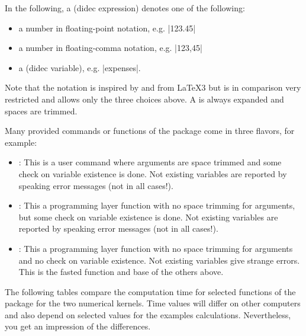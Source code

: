 \documentclass[a4paper,11pt]{ltxdoc}
\begin{document}
\medskip

In the following, a  (didec expression) denotes one of
the following:
\begin{itemize}
\item a number in floating-point notation, e.g. |123.45|
\item a number in floating-comma notation, e.g. |123,45|
\item a  (didec variable), e.g. |expenses|.
\end{itemize}
Note that the notation  is inspired by  and 
from \LaTeX3 but is in comparison very restricted and allows only the three choices above.
A  is always expanded and spaces are trimmed.

\medskip

Many provided commands or functions of the package come in three flavors, for
example:
\begin{itemize}
\item {}: This is a user command where arguments are space trimmed
  and some check on variable existence is done.
  Not existing variables are reported by speaking error messages (not in all cases!).
\item {}: This a programming layer function
  with no space trimming for arguments, but some check on variable existence is done.
  Not existing variables are reported by speaking error messages (not in all cases!).
\item {}: This a programming layer function
  with no space trimming for arguments and no check on variable existence.
  Not existing variables give strange errors.
  This is the fasted function and base of the others above.
\end{itemize}


\clearpage
The following tables compare the computation time for selected functions of
the package for the two numerical kernels. Time values will differ on other
computers and also depend on selected values for the examples calculations.
Nevertheless, you get an impression of the differences.
\end{document}
